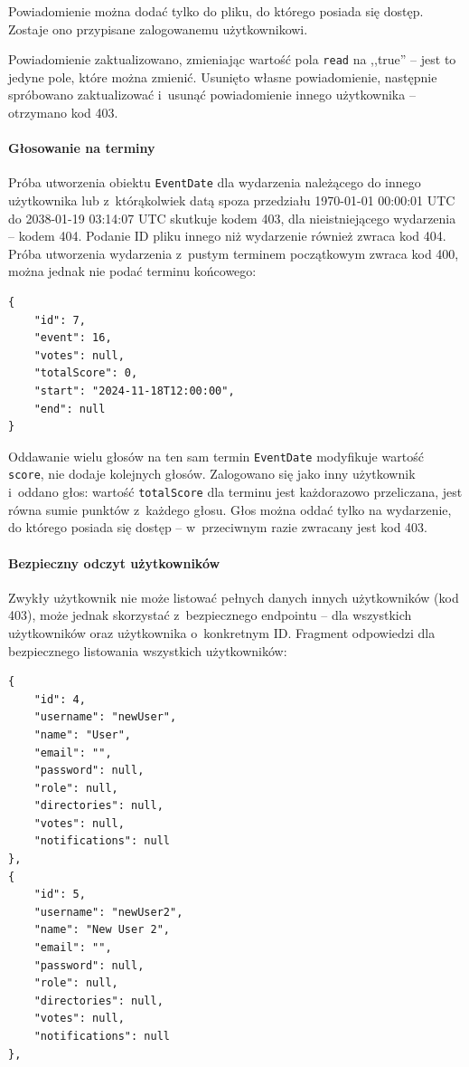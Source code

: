 \documentclass[a4paper,twoside,12pt]{book}
\begin{document}
Powiadomienie można dodać tylko do pliku, do którego posiada się dostęp. Zostaje ono przypisane zalogowanemu użytkownikowi.

Powiadomienie zaktualizowano, zmieniając wartość pola \texttt{read} na ,,true'' -- jest to jedyne pole, które można zmienić. Usunięto własne powiadomienie, następnie spróbowano zaktualizować i~usunąć powiadomienie innego użytkownika -- otrzymano kod 403.

\paragraph{Głosowanie na terminy}
Próba utworzenia obiektu \texttt{EventDate} dla wydarzenia należącego do innego użytkownika lub z~którąkolwiek datą spoza przedziału 1970-01-01 00:00:01 UTC do 2038-01-19 03:14:07 UTC skutkuje kodem 403, dla nieistniejącego wydarzenia -- kodem 404. Podanie ID pliku innego niż wydarzenie również zwraca kod 404. Próba utworzenia wydarzenia z~pustym terminem początkowym zwraca kod 400, można jednak nie podać terminu końcowego:
\begin{verbatim}
{
	"id": 7,
	"event": 16,
	"votes": null,
	"totalScore": 0,
	"start": "2024-11-18T12:00:00",
	"end": null
}
\end{verbatim}

Oddawanie wielu głosów na ten sam termin \texttt{EventDate} modyfikuje wartość \texttt{score}, nie dodaje kolejnych głosów. Zalogowano się jako inny użytkownik i~oddano głos: wartość \texttt{totalScore} dla terminu jest każdorazowo przeliczana, jest równa sumie punktów z~każdego głosu. Głos można oddać tylko na wydarzenie, do którego posiada się dostęp -- w~przeciwnym razie zwracany jest kod 403.

\paragraph{Bezpieczny odczyt użytkowników}
Zwykły użytkownik nie może listować pełnych danych innych użytkowników (kod 403), może jednak skorzystać z~bezpiecznego endpointu -- dla wszystkich użytkowników oraz użytkownika o~konkretnym ID. Fragment odpowiedzi dla bezpiecznego listowania wszystkich użytkowników:
\begin{verbatim}
{
	"id": 4,
	"username": "newUser",
	"name": "User",
	"email": "",
	"password": null,
	"role": null,
	"directories": null,
	"votes": null,
	"notifications": null
},
{
	"id": 5,
	"username": "newUser2",
	"name": "New User 2",
	"email": "",
	"password": null,
	"role": null,
	"directories": null,
	"votes": null,
	"notifications": null
},
\end{verbatim}
\end{document}
